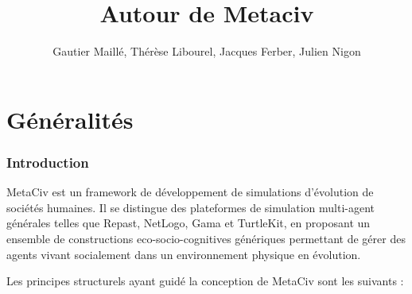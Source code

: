 \documentclass[a4paper,oneside,12 pt]{article}
\title{Autour de Metaciv}
\author {Gautier Maillé, Thérèse Libourel, Jacques Ferber, Julien Nigon}
\date{}
\begin{document}
\maketitle

\newpage

\tableofcontents %

\newpage

\part{Généralités}
\section{Introduction}
MetaCiv est un framework de développement de simulations d'évolution de sociétés humaines. Il se distingue des plateformes de simulation multi-agent générales telles que Repast, NetLogo, Gama et TurtleKit, en proposant un ensemble de constructions eco-socio-cognitives génériques permettant de gérer des agents vivant socialement dans un environnement physique en évolution.

Les principes structurels ayant guidé la conception de MetaCiv sont les suivants :
\end{document}
